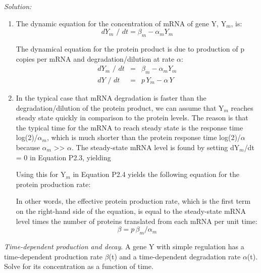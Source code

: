 \begin{exerciselist}
\textit{Solution:}

\begin{enumerate}
\item The dynamic equation for the concentration of mRNA of gene Y, Y$_{m}$, 
is:
\begin{equation}
dY_m \mbox{ / }dt = \beta _m - \alpha _m Y_m 
\end{equation}

The dynamical equation for the protein product is due to production of p 
copies per mRNA and degradation/dilution at rate $\alpha $:
\begin{eqnarray}
dY_m \mbox{ / }dt &=& \beta _m - \alpha _m Y_m \\
dY\mbox{ / }dt &=& p\,Y_m - \alpha \,Y
\end{eqnarray}
\item
 In the typical case that mRNA degradation is faster than the 
degradation/dilution of the protein product, we can assume that Y$_{m}$ 
reaches steady state quickly in comparison to the protein levels. The reason 
is that the typical time for the mRNA to reach steady state is the response 
time log(2)/$\alpha _{m}$, which is much shorter than the protein response 
time log(2)/$\alpha $ because $\alpha _{m}$ >> $\alpha $. The steady-state 
mRNA level is found by setting dY$_{m}$/dt = 0 in Equation P2.3, yielding



Using this for Y$_{m}$ in Equation P2.4 yields the following equation for 
the protein production rate:


In other words, the effective protein production rate, which is the first 
term on the right-hand side of the equation, is equal to the steady-state 
mRNA level times the number of proteins translated from each mRNA per unit 
time:
\begin{equation}
\beta = p\,\beta _m /\alpha_m
\end{equation}

\end{enumerate}

\item \textit{Time-dependent production and decay}. A gene Y with simple regulation has a time-dependent production rate 
$\beta $(t) and a time-dependent degradation rate $\alpha $(t). Solve for 
its concentration as a function of time.
\end{exerciselist}


